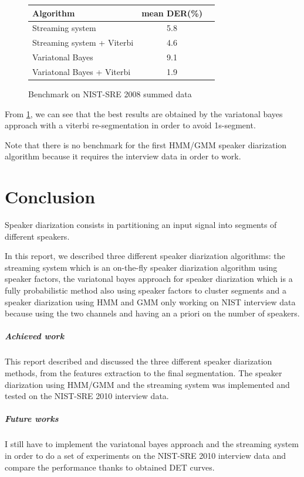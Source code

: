 \documentclass{techrep} %
\begin{document}
\begin{figure}[H]
  \centering
  \begin{tabular}{|l|c|r|}
    \hline
    \textbf{Algorithm} & \textbf{mean DER(\%)} \\
    \hline
    Streaming system & 5.8\\
    \hline
    Streaming system + Viterbi & 4.6\\
    \hline
    Variatonal Bayes & 9.1\\
    \hline
    Variatonal Bayes + Viterbi & 1.9\\
    \hline
  \end{tabular}
  \label{benchou}
  \caption{Benchmark on NIST-SRE 2008 summed data}
\end{figure}

From \ref{benchou}, we can see that the best results are obtained by the variatonal bayes approach with a viterbi re-segmentation in order to avoid 1s-segment.

Note that there is no benchmark for the first HMM/GMM speaker
diarization algorithm because it requires the interview data in order
to work.

\chapter{Conclusion}

Speaker diarization consists in partitioning an input signal into
segments of different speakers.

In this report, we described three different speaker diarization
algorithms: the streaming system which is an on-the-fly speaker
diarization algorithm using speaker factors, the variatonal bayes
approach for speaker diarization which is a fully probabilistic method
also using speaker factors to cluster segments and a speaker
diarization using HMM and GMM only working on NIST interview data
because using the two channels and having an a priori on the number of
speakers.

\paragraph{Achieved work} This report described and discussed the three different speaker diarization methods, from the features extraction to the final segmentation. The speaker diarization using HMM/GMM and the streaming system was implemented and tested on the NIST-SRE 2010 interview data.

\paragraph{Future works} I still have to implement the variatonal bayes approach and the streaming system in order to do a set of experiments on the NIST-SRE 2010 interview data and compare the performance thanks to obtained DET curves.

 \nocite{*}
\end{document}
